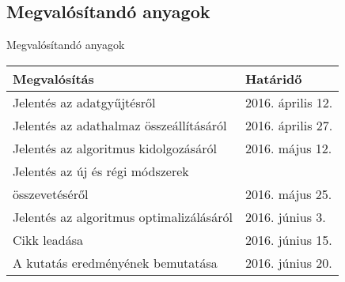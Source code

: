 \subsection{Megvalósítandó anyagok}
\begin{frame}{Megvalósítandó anyagok}

\begin{table}
\begin{tabular}{l | l }
Megvalósítás & Határidő\\
\hline \hline
Jelentés az adatgyűjtésről & 2016. április 12. \\
Jelentés az adathalmaz összeállításáról & 2016. április 27.\\
Jelentés az algoritmus kidolgozásáról & 2016. május 12. \\
Jelentés az új és régi módszerek \\
összevetéséről & 2016. május 25.\\
Jelentés az algoritmus optimalizálásáról & 2016. június 3. \\
Cikk leadása & 2016. június 15.\\ 
A kutatás eredményének bemutatása & 2016. június 20.
\end{tabular}
\end{table}

\end{frame}